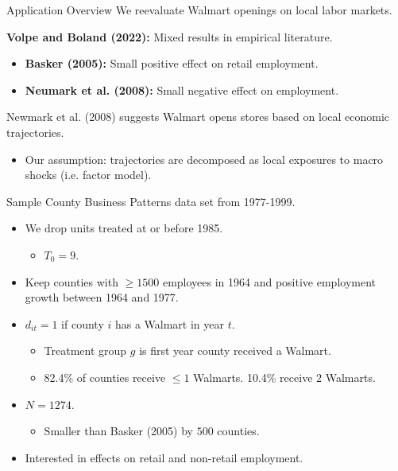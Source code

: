 \documentclass{beamer}
\newcommand{\1}{\mathds{1}} %
\begin{document}

\begin{frame}{Application Overview}
    We reevaluate Walmart openings on local labor markets. 

    \vspace{.5cm}

    \textbf{Volpe and Boland (2022):} Mixed results in empirical literature.
    \begin{itemize}
        \item \textbf{Basker (2005):} Small positive effect on retail employment.
        \item \textbf{Neumark et al. (2008):} Small negative effect on employment. 
    \end{itemize}

    \vspace{.5cm}

    Newmark et al. (2008) suggests Walmart opens stores based on local economic trajectories.
    \begin{itemize}
        \item Our assumption: trajectories are decomposed as local exposures to macro shocks (i.e. factor model).
    \end{itemize}
\end{frame}


\begin{frame}{Sample}
    County Business Patterns data set from 1977-1999. 
    \begin{itemize}
        \item We drop units treated at or before 1985.
        \begin{itemize}
            \item $T_0 = 9$.
        \end{itemize}
        \item Keep counties with $\geq 1500$ employees in 1964 and positive employment growth between 1964 and 1977.
        \item $d_{it} = 1$ if county $i$ has a Walmart in year $t$.
        \begin{itemize}
            \item Treatment group $g$ is first year county received a Walmart. 
            \item 82.4\% of counties receive $\leq 1$ Walmarts. 10.4\% receive $2$ Walmarts. 
        \end{itemize}
        \item $N = 1274$.
        \begin{itemize}
            \item Smaller than Basker (2005) by $500$ counties.
        \end{itemize}
        \item Interested in effects on retail and non-retail employment.
    \end{itemize}
\end{frame}
\end{document}
